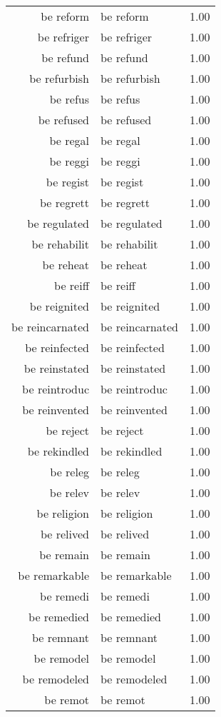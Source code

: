 \begin{table}[ht]
\begin{tabular}{rlr}
  be reform & be reform & 1.00 \\ 
  be refriger & be refriger & 1.00 \\ 
  be refund & be refund & 1.00 \\ 
  be refurbish & be refurbish & 1.00 \\ 
  be refus & be refus & 1.00 \\ 
  be refused & be refused & 1.00 \\ 
  be regal & be regal & 1.00 \\ 
  be reggi & be reggi & 1.00 \\ 
  be regist & be regist & 1.00 \\ 
  be regrett & be regrett & 1.00 \\ 
  be regulated & be regulated & 1.00 \\ 
  be rehabilit & be rehabilit & 1.00 \\ 
  be reheat & be reheat & 1.00 \\ 
  be reiff & be reiff & 1.00 \\ 
  be reignited & be reignited & 1.00 \\ 
  be reincarnated & be reincarnated & 1.00 \\ 
  be reinfected & be reinfected & 1.00 \\ 
  be reinstated & be reinstated & 1.00 \\ 
  be reintroduc & be reintroduc & 1.00 \\ 
  be reinvented & be reinvented & 1.00 \\ 
  be reject & be reject & 1.00 \\ 
  be rekindled & be rekindled & 1.00 \\ 
  be releg & be releg & 1.00 \\ 
  be relev & be relev & 1.00 \\ 
  be religion & be religion & 1.00 \\ 
  be relived & be relived & 1.00 \\ 
  be remain & be remain & 1.00 \\ 
  be remarkable & be remarkable & 1.00 \\ 
  be remedi & be remedi & 1.00 \\ 
  be remedied & be remedied & 1.00 \\ 
  be remnant & be remnant & 1.00 \\ 
  be remodel & be remodel & 1.00 \\ 
  be remodeled & be remodeled & 1.00 \\ 
  be remot & be remot & 1.00 \\ 

\end{tabular}
\end{table}
